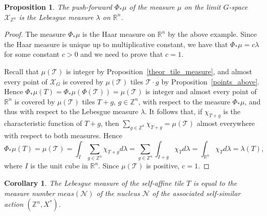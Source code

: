 \documentclass[12pt]{article}
\newcommand{\Z}{\mathbb{Z}}
\newcommand{\limGs}[1][G]{\mathcal{X}_{#1}}
\newcommand{\mgr}{meas}
\newcommand{\tile}{\mathscr{T}}
\newcommand{\nucl}{\mathcal{N}}
\newtheorem{prop}[theor]{Proposition}
\newtheorem{cor}[theor]{Corollary}
\theoremstyle{definition}
\begin{document}
\begin{prop}
The push-forward $\Phi_*\mu$ of the measure $\mu$ on the limit $G$-space $\limGs[\Z^n]$ is the
Lebesgue measure $\lambda$ on $\mathbb{R}^n$.
\end{prop}
\begin{proof}
The measure $\Phi_*\mu$ is the Haar measure on $\mathbb{R}^n$ by the above example. Since the Haar
measure is unique up to multiplicative constant, we have that $\Phi_*\mu=c\lambda$ for some
constant $c>0$ and we need to prove that $c=1$.

Recall that $\mu(\tile)$ is integer by Proposition~\ref{theor_tile_measure}, and almost every point
of $\limGs$ is covered by $\mu(\tile)$ tiles $\tile\cdot g$ by Proposition~\ref{points_above}.
Hence $\Phi_*\mu(T)=\Phi_*\mu(\Phi(\tile))=\mu(\tile)$ is integer and almost every point of
$\mathbb{R}^n$ is covered by $\mu(\tile)$ tiles $T+g$, $g\in\Z^n$, with respect to the measure
$\Phi_*\mu$, and thus with respect to the Lebesgue measure $\lambda$. It follows that, if
$\chi_{T+g}$ is the characteristic function of $T+g$, then $\sum_{g\in\Z^n}\chi_{T+g}=\mu(\tile)$
almost everywhere with respect to both measures. Hence
\[
\Phi_*\mu(T)=\mu(\tile)=\int_I\sum_{g\in\Z^n}\chi_{T+g}d\lambda=\sum_{g\in\Z^n}\int_{I+g}\chi_T
d\lambda=\int_{\mathbb{R}^n}\chi_T d\lambda=\lambda(T),
\]
where $I$ is the unit cube in $\mathbb{R}^n$. Since $\mu(\tile)$ is positive, $c=1$.
\end{proof}



\begin{cor}
The Lebesgue measure of the self-affine tile $T$ is equal to the measure number $\mgr(\nucl)$ of
the nucleus $\nucl$ of the associated self-similar action $(\mathbb{Z}^n,X^{*})$.
\end{cor}
\end{document}
